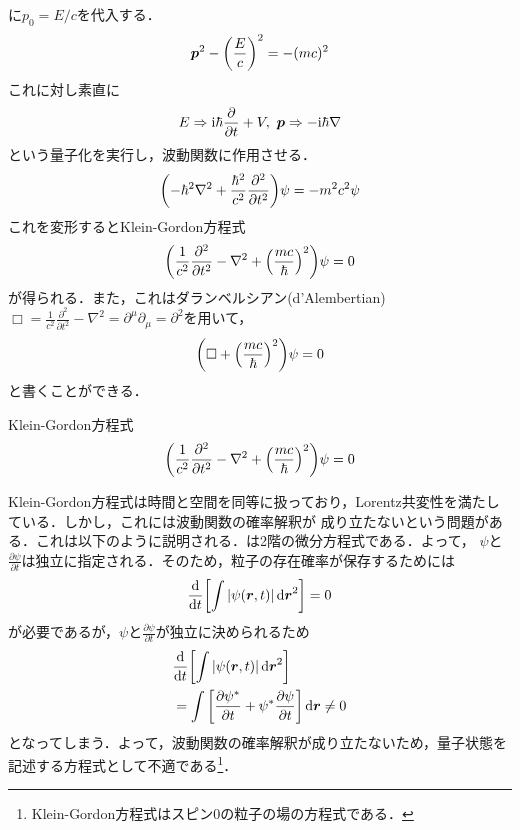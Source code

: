 \documentclass{report}
\begin{document}
に$p_0 = E/c$を代入する．
\begin{align}
  \bm{p}^2 - \qty(\frac{E}{c})^2 = -(mc)^2
\end{align}
これに対し素直に
\begin{align}
  E \Rightarrow \mathrm{i}\hbar\frac{\partial}{\partial t} + V,\ \bm{p} \Rightarrow -\mathrm{i}\hbar \nabla 
\end{align}
という量子化を実行し，波動関数に作用させる．
\begin{align}
  \qty(-\hbar^2\nabla^2 + \frac{\hbar^2}{c^2}\frac{\partial^2}{\partial t^2})\psi = -m^2c^2\psi
\end{align}
これを変形するとKlein-Gordon方程式
\begin{align}
  \qty(\frac{1}{c^2}\frac{\partial^2}{\partial t^2} - \nabla^2 + \qty(\frac{mc}{\hbar})^2)\psi = 0 \label{Klein-Gordon-equation}
\end{align}
が得られる．また，これはダランベルシアン(d'Alembertian)$\Box = \frac{1}{c^2}\frac{\partial^2}{\partial t^2} - \nabla^2 = \partial^\mu\partial_\mu = \partial^2$を用いて，
\begin{align}
  \qty(\Box + \qty(\frac{mc}{\hbar})^2)\psi = 0
\end{align}
と書くことができる．
\begin{itembox}[l]{Klein-Gordon方程式}
  \begin{equation}
    \qty(\frac{1}{c^2}\frac{\partial^2}{\partial t^2} - \nabla^2 + \qty(\frac{mc}{\hbar})^2)\psi = 0
  \end{equation}
\end{itembox}
Klein-Gordon方程式は時間と空間を同等に扱っており，Lorentz共変性を満たしている．しかし，これには波動関数の確率解釈が
成り立たないという問題がある．これは以下のように説明される．は2階の微分方程式である．よって，
$\psi$と$\frac{\partial \psi}{\partial t}$は独立に指定される．そのため，粒子の存在確率が保存するためには
\begin{align}
  \frac{\mathrm{d}}{\dd{t}}\qty[\int \abs{\psi(\bm{r}, t)} \dd{\bm{r}}^2] = 0
\end{align}
が必要であるが，$\psi$と$\frac{\partial \psi}{\partial t}$が独立に決められるため
\begin{align}
  &\frac{\mathrm{d}}{\dd{t}}\qty[\int \abs{\psi(\bm{r}, t)} \dd{\bm{r}}^2]\\
  &= \int \qty[\frac{\partial \psi^{*}}{\partial t} + \psi^{*}\frac{\partial \psi}{\partial t}] \dd{\bm{r}} \neq 0
\end{align}
となってしまう．よって，波動関数の確率解釈が成り立たないため，量子状態を記述する方程式として不適である\footnote{Klein-Gordon方程式はスピン0の粒子の場の方程式である．}．
\end{document}
